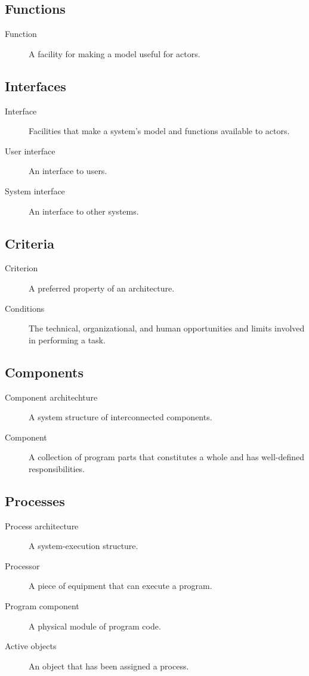 \subsection{Functions}
\begin{description}
    \item[Function] A facility for making a model useful for actors.
\end{description}

\subsection{Interfaces}
\begin{description}
    \item[Interface] Facilities that make a system's model and functions available to actors.
    \item[User interface] An interface to users.
    \item[System interface] An interface to other systems.
\end{description}

\subsection{Criteria}
\begin{description}
    \item[Criterion] A preferred property of an architecture.
    \item[Conditions] The technical, organizational, and human opportunities and limits involved in performing a task.
\end{description}

\subsection{Components}
\begin{description}
    \item[Component architechture] A system structure of interconnected components.
    \item[Component] A collection of program parts that constitutes a whole and has well-defined responsibilities.
\end{description}

\subsection{Processes}
\begin{description}
    \item[Process architecture] A system-execution structure.
    \item[Processor] A piece of equipment that can execute a program.
    \item[Program component] A physical module of program code.
    \item[Active objects] An object that has been assigned a process.
\end{description}

